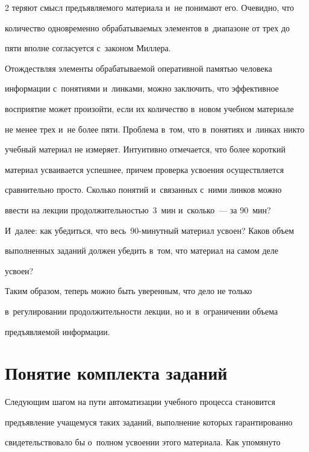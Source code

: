 \begin{multicols}{2}
теряют смысл предъявляемого материала и~не понимают его. Очевидно, что 


количество одновременно обрабатываемых элементов в~диапазоне от трех до 


пяти вполне согласуется с~законом Миллера.


  


  Отождествляя элементы обрабатываемой оперативной памятью человека 


информации с~понятиями и~линками, можно заключить, что эффективное 


восприятие может произойти, если их количество в~новом учебном материале 


не менее трех и~не более пяти. Проблема в~том, что в~понятиях и~линках никто 


учебный материал не измеряет. Интуитивно отмечается, что более короткий 


материал усваивается успешнее, причем проверка усвоения осуществляется 


сравнительно просто. Сколько понятий и~связанных с~ними линков можно 


ввести на лекции продолжительностью~3~мин и~сколько~--- за 90~мин? 


И~далее: как убедиться, что весь~90-ми\-нут\-ный материал усвоен? Каков объем 


выполненных заданий должен убедить в~том, что материал на самом деле 


усвоен? 


  


  Таким образом, теперь можно быть уверенным, что дело не только 


в~регулировании продолжительности лекции, но и~в~ограничении объема 


предъявляемой информации.


  


\section{Понятие комплекта заданий}


  Следующим шагом на пути автоматизации учебного процесса становится 


предъявление учащемуся таких заданий, выполнение которых гарантированно 


свидетельствовало бы о~полном усвоении этого материала. Как упомянуто 



\end{multicols}
